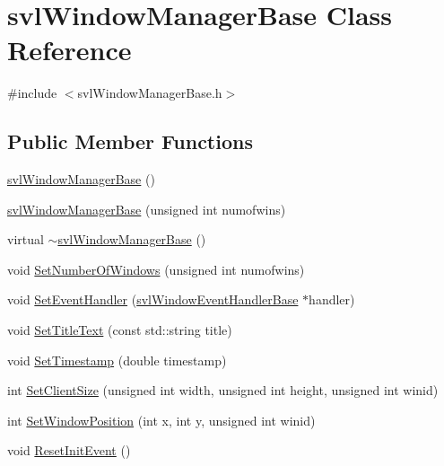 \hypertarget{classsvl_window_manager_base}{\section{svl\-Window\-Manager\-Base Class Reference}
\label{classsvl_window_manager_base}
}


{\ttfamily \#include $<$svl\-Window\-Manager\-Base.\-h$>$}

\subsection*{Public Member Functions}
\begin{DoxyCompactItemize}
\item 
\hyperlink{classsvl_window_manager_base_a5087b4d9af2db708f81be376cf46b06b}{svl\-Window\-Manager\-Base} ()
\item 
\hyperlink{classsvl_window_manager_base_add84ebed327a1b2faa7e6a5d73f17d73}{svl\-Window\-Manager\-Base} (unsigned int numofwins)
\item 
virtual \hyperlink{classsvl_window_manager_base_ac1c83fd91d1b3367303d39d886c6f885}{$\sim$svl\-Window\-Manager\-Base} ()
\item 
void \hyperlink{classsvl_window_manager_base_a307227f63a55fd315fe759f3f1084740}{Set\-Number\-Of\-Windows} (unsigned int numofwins)
\item 
void \hyperlink{classsvl_window_manager_base_aeb586c4a222cd0818febff972f9be57b}{Set\-Event\-Handler} (\hyperlink{classsvl_window_event_handler_base}{svl\-Window\-Event\-Handler\-Base} $\ast$handler)
\item 
void \hyperlink{classsvl_window_manager_base_a678c57c6ff692a26ef40dd8368cb9f2b}{Set\-Title\-Text} (const std\-::string title)
\item 
void \hyperlink{classsvl_window_manager_base_a5b7747b205fa459716743386bf4a5f2d}{Set\-Timestamp} (double timestamp)
\item 
int \hyperlink{classsvl_window_manager_base_ae03da24470c7298a5d8cec2877aed30c}{Set\-Client\-Size} (unsigned int width, unsigned int height, unsigned int winid)
\item 
int \hyperlink{classsvl_window_manager_base_a2060e663694a740606e9c7ced951bf25}{Set\-Window\-Position} (int x, int y, unsigned int winid)
\item 
void \hyperlink{classsvl_window_manager_base_aaf4f945998c257510fbc77c1d80f1648}{Reset\-Init\-Event} ()
\item 

\end{DoxyCompactItemize}
